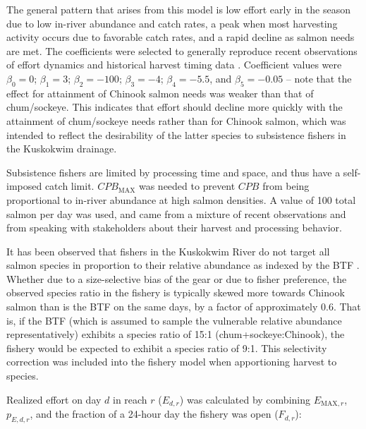 \documentclass[12pt,]{book}
\theoremstyle{definition}
\theoremstyle{definition}
\theoremstyle{definition}
\theoremstyle{remark}
\begin{document}
\noindent
The general pattern that arises from this model is low effort early in
the season due to low in-river abundance and catch rates, a peak when
most harvesting activity occurs due to favorable catch rates, and a
rapid decline as salmon needs are met. The coefficients were selected to
generally reproduce recent observations of effort dynamics
\citep{staton-coggins-2016, staton-coggins-2017, staton-2018} and
historical harvest timing data \citep[ and see Appendix \ref{appendix-b}
for a validation]{hamazaki-2008, hamazaki-2011}. Coefficient values were
\(\beta_0 = 0\); \(\beta_1 = 3\); \(\beta_2 = -100\); \(\beta_3 = -4\);
\(\beta_4 = -5.5\), and \(\beta_5 = -0.05\) -- note that the effect for
attainment of Chinook salmon needs was weaker than that of chum/sockeye.
This indicates that effort should decline more quickly with the
attainment of chum/sockeye needs rather than for Chinook salmon, which
was intended to reflect the desirability of the latter species to
subsistence fishers in the Kuskokwim drainage.

Subsistence fishers are limited by processing time and space, and thus
have a self-imposed catch limit. \(CPB_{\text{MAX}}\) was needed to
prevent \(CPB\) from being proportional to in-river abundance at high
salmon densities. A value of 100 total salmon per day was used, and came
from a mixture of recent observations
\citep{staton-coggins-2016, staton-coggins-2017, staton-2018} and from
speaking with stakeholders about their harvest and processing behavior.

It has been observed that fishers in the Kuskokwim River do not target
all salmon species in proportion to their relative abundance as indexed
by the BTF
\citep{staton-coggins-2016, staton-coggins-2017, staton-2018}. Whether
due to a size-selective bias of the gear or due to fisher preference,
the observed species ratio in the fishery is typically skewed more
towards Chinook salmon than is the BTF on the same days, by a factor of
approximately 0.6. That is, if the BTF (which is assumed to sample the
vulnerable relative abundance representatively) exhibits a species ratio
of 15:1 (chum+sockeye:Chinook), the fishery would be expected to exhibit
a species ratio of 9:1. This selectivity correction was included into
the fishery model when apportioning harvest to species.

Realized effort on day \(d\) in reach \(r\) (\(E_{d,r}\)) was calculated
by combining \(E_{\text{MAX},r}\), \(p_{E,d,r}\), and the fraction of a
24-hour day the fishery was open (\(F_{d,r}\)):
\end{document}
